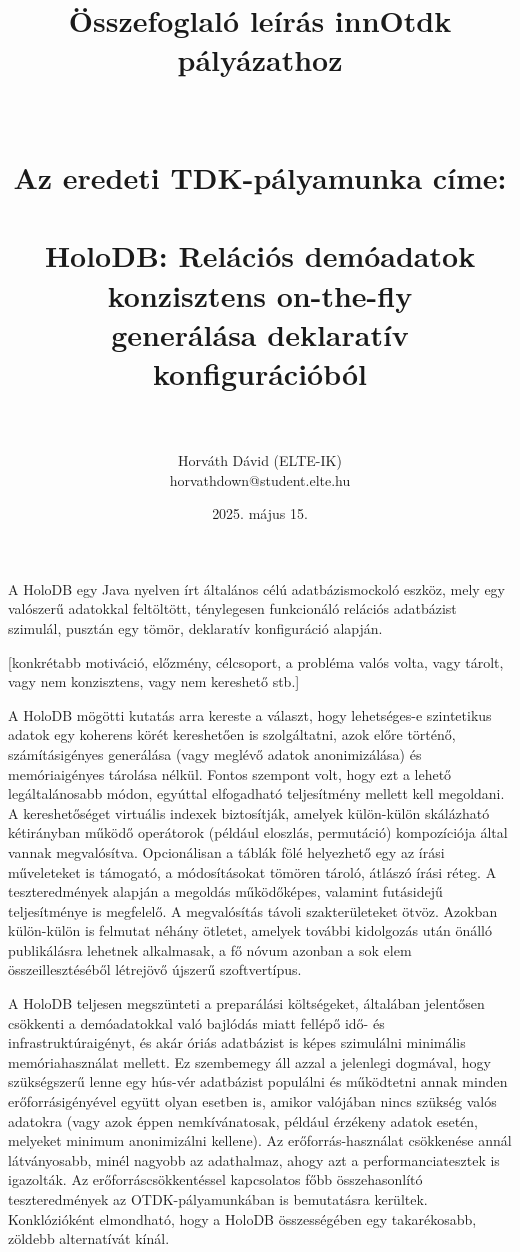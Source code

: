 \documentclass[12pt]{article}
\title{Összefoglaló leírás innOtdk pályázathoz \\ ~ \\ ~ \\ {\Large Az eredeti TDK-pályamunka címe: \\ ~ \\ HoloDB: Relációs demóadatok konzisztens on-the-fly \\ generálása deklaratív konfigurációból} \\ ~}
\author{Horváth Dávid (ELTE-IK) \\ horvathdown@student.elte.hu}
\date{2025. május 15.}
\begin{document}
\begin{titlepage}
\maketitle
\thispagestyle{empty}
\end{titlepage}

\cleardoublepage

A HoloDB egy Java nyelven írt általános célú adatbázismockoló eszköz, mely egy valószerű adatokkal feltöltött, ténylegesen funkcionáló relációs adatbázist szimulál, pusztán egy tömör, deklaratív konfiguráció alapján.

[konkrétabb motiváció, előzmény, célcsoport, a probléma valós volta, vagy tárolt, vagy nem konzisztens, vagy nem kereshető stb.]

A HoloDB mögötti kutatás arra kereste a választ, hogy lehetséges-e szintetikus adatok egy koherens körét kereshetően is szolgáltatni, azok előre történő, számításigényes generálása (vagy meglévő adatok anonimizálása) és memóriaigényes tárolása nélkül. Fontos szempont volt, hogy ezt a lehető legáltalánosabb módon, egyúttal elfogadható teljesítmény mellett kell megoldani.
A kereshetőséget virtuális indexek biztosítják, amelyek külön-külön skálázható kétirányban működő operátorok (például eloszlás, permutáció) kompozíciója által vannak megvalósítva.
Opcionálisan a táblák fölé helyezhető egy az írási műveleteket is támogató, a módosításokat tömören tároló, átlászó írási réteg.
A teszteredmények alapján a megoldás működőképes, valamint futásidejű teljesítménye is megfelelő.
A megvalósítás távoli szakterületeket ötvöz. Azokban külön-külön is felmutat néhány ötletet, amelyek további kidolgozás után önálló publikálásra lehetnek alkalmasak, a fő nóvum azonban a sok elem összeillesztéséből létrejövő újszerű szoftvertípus.

A HoloDB teljesen megszünteti a preparálási költségeket, általában jelentősen csökkenti a demóadatokkal való bajlódás miatt fellépő idő- és infrastruktúraigényt, és akár óriás adatbázist is képes szimulálni minimális memóriahasználat mellett.
Ez szembemegy áll azzal a jelenlegi dogmával, hogy szükségszerű lenne egy hús-vér adatbázist populálni és működtetni annak minden erőforrásigényével együtt olyan esetben is, amikor valójában nincs szükség valós adatokra (vagy azok éppen nemkívánatosak, például érzékeny adatok esetén, melyeket minimum anonimizálni kellene).
Az erőforrás-használat csökkenése annál látványosabb, minél nagyobb az adathalmaz, ahogy azt a performanciatesztek is igazolták.
Az erőforráscsökkentéssel kapcsolatos főbb összehasonlító teszteredmények az OTDK-pályamunkában is bemutatásra kerültek.
Konklózióként elmondható, hogy a HoloDB összességében egy takarékosabb, zöldebb alternatívát kínál.
\end{document}
